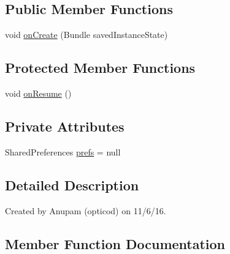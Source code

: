 \subsection*{Public Member Functions}
\begin{DoxyCompactItemize}
\item 
void \hyperlink{classorg_1_1buildmlearn_1_1infotemplate_1_1activities_1_1SplashActivity_a869d516153f5bd7537810e213759d73a}{on\+Create} (Bundle saved\+Instance\+State)
\end{DoxyCompactItemize}
\subsection*{Protected Member Functions}
\begin{DoxyCompactItemize}
\item 
void \hyperlink{classorg_1_1buildmlearn_1_1infotemplate_1_1activities_1_1SplashActivity_a0c9241ed12511ff63490cda73bb9468c}{on\+Resume} ()
\end{DoxyCompactItemize}
\subsection*{Private Attributes}
\begin{DoxyCompactItemize}
\item 
Shared\+Preferences \hyperlink{classorg_1_1buildmlearn_1_1infotemplate_1_1activities_1_1SplashActivity_a95769f2194e7539312bb209b94de7853}{prefs} = null
\end{DoxyCompactItemize}


\subsection{Detailed Description}
Created by Anupam (opticod) on 11/6/16. 

\subsection{Member Function Documentation}
